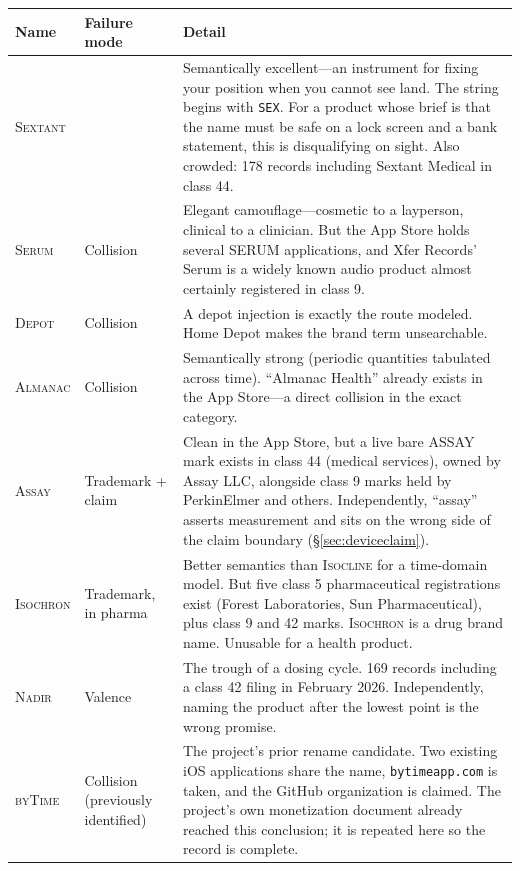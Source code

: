 \documentclass[11pt,a4paper]{article}
\newcommand{\bad}[1]{\obs{#1}}
\newcommand{\code}[1]{\texttt{\small #1}}
\newcommand{\name}[1]{\textsc{#1}}
\begin{document}
\begin{longtable}{@{}L{2.9cm}L{3.6cm}L{8.5cm}@{}}
\toprule
\textbf{Name} & \textbf{Failure mode} & \textbf{Detail} \\
\midrule
\endhead
\name{Sextant} &
\bad{Discretion, catastrophically} &
Semantically excellent---an instrument for fixing your position when
you cannot see land. The string begins with \code{SEX}. For a product
whose brief is that the name must be safe on a lock screen and a bank
statement, this is disqualifying on sight. Also crowded: 178 records
including Sextant Medical in class 44. \\[0.4em]

\name{Serum} &
Collision & Elegant camouflage---cosmetic to a layperson, clinical to a
clinician. But the App Store holds several SERUM applications, and Xfer
Records' Serum is a widely known audio product almost certainly
registered in class 9. \\[0.4em]

\name{Depot} &
Collision & A depot injection is exactly the route modeled. Home Depot
makes the brand term unsearchable. \\[0.4em]

\name{Almanac} &
Collision & Semantically strong (periodic quantities tabulated across
time). ``Almanac Health'' already exists in the App Store---a direct
collision in the exact category. \\[0.4em]

\name{Assay} &
Trademark + claim &
Clean in the App Store, but a live bare \name{ASSAY} mark exists in
class 44 (medical services), owned by Assay LLC, alongside class 9
marks held by PerkinElmer and others. Independently, ``assay'' asserts
measurement and sits on the wrong side of the claim boundary
(\S\ref{sec:deviceclaim}). \\[0.4em]

\name{Isochron} &
Trademark, in pharma &
Better semantics than \name{Isocline} for a time-domain model. But five
class 5 pharmaceutical registrations exist (Forest Laboratories, Sun
Pharmaceutical), plus class 9 and 42 marks. \name{Isochron} is a drug
brand name. Unusable for a health product. \\[0.4em]

\name{Nadir} &
Valence & The trough of a dosing cycle. 169 records including a class
42 filing in February 2026. Independently, naming the product after the
lowest point is the wrong promise. \\[0.4em]

\name{byTime} &
Collision (previously identified) &
The project's prior rename candidate. Two existing iOS applications
share the name, \code{bytimeapp.com} is taken, and the GitHub
organization is claimed. The project's own monetization document
already reached this conclusion; it is repeated here so the record is
complete. \\[0.4em]


\end{longtable}
\end{document}
